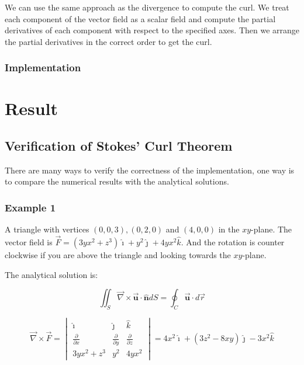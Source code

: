 \documentclass[12pt]{article}
\begin{document}
We can use the same approach as the divergence to compute the curl. We treat each component of the vector field as a scalar field and compute the partial derivatives of each component with respect to the specified axes.
Then we arrange the partial derivatives in the correct order to get the curl.

\subsubsection{Implementation}

\newpage
\section{Result}



\subsection{Verification of Stokes' Curl Theorem}

There are many ways to verify the correctness of the implementation, one way is to compare the numerical results with the analytical solutions.

\subsubsection{Example 1}

A triangle with vertices \((0, 0, 3), (0, 2, 0)\) and \((4, 0, 0)\) in the \(x y\)-plane. The vector field is \(\vec{F}=\left(3 y x^2+z^3\right) \hat{\imath}+y^2 \hat{\jmath}+4 y x^2 \hat{k}\).
And the rotation is counter clockwise if you are above the triangle and looking towards the \(x y\)-plane.

The analytical solution is:

\[
    \iint_S \vec{\nabla} \times \overrightarrow{\boldsymbol{u}} \cdot \widehat{\boldsymbol{n}} d S=\oint_C \overrightarrow{\boldsymbol{u}} \cdot d \vec{r}
\]

\[
    \vec{\nabla} \times \vec{F} =
    \begin{vmatrix}
        \hat{\imath}                & \hat{\jmath}                & \hat{k}                     \\
        \frac{\partial}{\partial x} & \frac{\partial}{\partial y} & \frac{\partial}{\partial z} \\
        3 y x^2 + z^3               & y^2                         & 4 y x^2
    \end{vmatrix}
    = 4 x^2 \hat{\imath} + \left(3 z^2 - 8 x y\right)  \hat{\jmath} - 3 x^2 \hat{k}
\]
\end{document}
